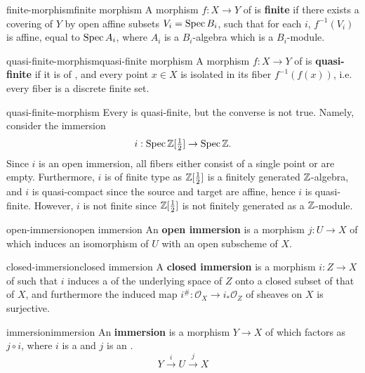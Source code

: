 \begin{topic}{finite-morphism}{finite morphism}
    A morphism $f : X \to Y$ of  is \textbf{finite} if there exists a covering of $Y$ by open affine subsets $V_i = \operatorname{Spec} B_i$, such that for each $i$, $f^{-1}(V_i)$ is affine, equal to $\operatorname{Spec} A_i$, where $A_i$ is a $B_i$-algebra which is a  $B_i$-module.
\end{topic}

\begin{topic}{quasi-finite-morphism}{quasi-finite morphism}
    A morphism $f : X \to Y$ of  is \textbf{quasi-finite} if it is of , and every point $x \in X$ is isolated in its fiber $f^{-1}(f(x))$, i.e. every fiber is a discrete finite set.
\end{topic}

\begin{example}{quasi-finite-morphism}
    Every  is quasi-finite, but the converse is not true. Namely, consider the immersion
    \[ i : \operatorname{Spec} \mathbb{Z}[\tfrac{1}{2}] \to \operatorname{Spec} \mathbb{Z} . \]
    Since $i$ is an open immersion, all fibers either consist of a single point or are empty. Furthermore, $i$ is of finite type as $\mathbb{Z}[\tfrac{1}{2}]$ is a finitely generated $\mathbb{Z}$-algebra, and $i$ is quasi-compact since the source and target are affine, hence $i$ is quasi-finite. However, $i$ is not finite since $\mathbb{Z}[\tfrac{1}{2}]$ is not finitely generated as a $\mathbb{Z}$-module.
\end{example}

\begin{topic}{open-immersion}{open immersion}
    An \textbf{open immersion} is a morphism $j : U \to X$ of  which induces an isomorphism of $U$ with an open subscheme of $X$.
\end{topic}

\begin{topic}{closed-immersion}{closed immersion}
    A \textbf{closed immersion} is a morphism $i : Z \to X$ of  such that $i$ induces a  of the underlying space of $Z$ onto a closed subset of that of $X$, and furthermore the induced map $i^\# : \mathcal{O}_X \to i_*\mathcal{O}_Z$ of sheaves on $X$ is surjective.
\end{topic}

\begin{topic}{immersion}{immersion}
    An \textbf{immersion} is a morphism $Y \to X$ of  which factors as $j \circ i$, where $i$ is a  and $j$ is an .
    \[ Y \xrightarrow{i} U \xrightarrow{j} X \]
\end{topic}

